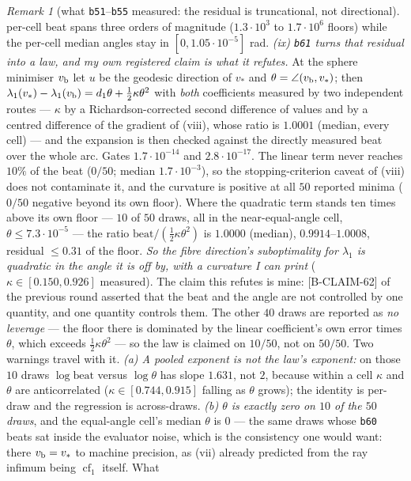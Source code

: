 \documentclass[11pt]{article}
\theoremstyle{remark}
\newtheorem{remark}{Remark}[section]
\begin{document}
\begin{remark}[what \texttt{b51}--\texttt{b55} measured: the residual is truncational, not directional]
per-cell beat spans three orders of magnitude ($1.3\cdot10^{3}$ to $1.7\cdot10^{6}$ floors) while the
per-cell median angles stay in $[0,1.05\cdot10^{-5}]$ rad.
\emph{(ix) \texttt{b61} turns that residual into a law, and my own registered claim is what it refutes.}
At the sphere minimiser $v_{\rm b}$ let $u$ be the geodesic direction of $v_\ast$ and
$\theta=\angle(v_{\rm b},v_\ast)$; then $\lambda_1(v_\ast)-\lambda_1(v_{\rm b})=d_1\theta+\tfrac12\kappa\theta^2$
with \emph{both} coefficients measured by two independent routes --- $\kappa$ by a Richardson-corrected
second difference of values and by a centred difference of the gradient of (viii), whose ratio is
$1.0001$ (median, every cell) --- and the expansion is then checked against the directly measured beat
over the whole arc. Gates $1.7\cdot10^{-14}$ and $2.8\cdot10^{-17}$. The linear term never reaches $10\%$
of the beat ($0/50$; median $1.7\cdot10^{-3}$), so the stopping-criterion caveat of (viii) does not
contaminate it, and the curvature is positive at all $50$ reported minima ($0/50$ negative beyond its own
floor). Where the quadratic term stands ten times above its own floor --- $10$ of $50$ draws, all in the
near-equal-angle cell, $\theta\le7.3\cdot10^{-5}$ --- the ratio
$\mathrm{beat}/(\tfrac12\kappa\theta^2)$ is $1.0000$ (median), $0.9914$--$1.0008$, residual $\le0.31$ of
the floor. \emph{So the fibre direction's suboptimality for $\lambda_1$ is quadratic in the angle it is
off by, with a curvature I can print} ($\kappa\in[0.150,0.926]$ measured). The claim this refutes is mine:
[B-CLAIM-62] of the previous round asserted that the beat and the angle are not controlled by one
quantity, and one quantity controls them. The other $40$ draws are reported as \emph{no leverage} --- the
floor there is dominated by the linear coefficient's own error times $\theta$, which exceeds
$\tfrac12\kappa\theta^2$ --- so the law is claimed on $10/50$, not on $50/50$. Two warnings travel with
it. \emph{(a) A pooled exponent is not the law's exponent:} on those $10$ draws
$\log\mathrm{beat}$ versus $\log\theta$ has slope $1.631$, not $2$, because within a cell $\kappa$ and
$\theta$ are anticorrelated ($\kappa\in[0.744,0.915]$ falling as $\theta$ grows); the identity is
per-draw and the regression is across-draws. \emph{(b) $\theta$ is exactly zero on $10$ of the $50$ draws},
and the equal-angle cell's median $\theta$ is $0$ --- the same draws whose \texttt{b60} beats sat inside
the evaluator noise, which is the consistency one would want: there $v_{\rm b}=v_\ast$ to machine
precision, as (vii) already predicted from the ray infimum being $\operatorname{cf}_1$ itself. What

\end{remark}
\end{document}
